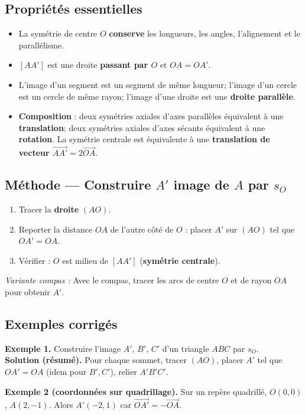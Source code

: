 \subsection*{Propriétés essentielles}
\begin{itemize}
	\item La symétrie de centre $O$ \textbf{conserve} les longueurs, les angles, l’alignement et le parallélisme.
	\item $[AA']$ est une droite \textbf{passant par $O$} et $OA=OA'$.
	\item L’image d’un segment est un segment de même longueur; l’image d’un cercle est un cercle de même rayon; l’image d’une droite est une \textbf{droite parallèle}.
	\item \textbf{Composition} : deux symétries axiales d’axes parallèles équivalent à une \textbf{translation}; deux symétries axiales d’axes sécants équivalent à une \textbf{rotation}. La symétrie centrale est équivalente à une \textbf{translation de vecteur $\overrightarrow{AA'}=2\overrightarrow{OA}$}.
\end{itemize}

\subsection*{Méthode — Construire $A'$ image de $A$ par $s_O$}
\begin{enumerate}
	\item Tracer la \textbf{droite} $(AO)$.
	\item Reporter la distance $OA$ de l’autre côté de $O$ : placer $A'$ sur $(AO)$ tel que $OA'=OA$.
	\item Vérifier : $O$ est milieu de $[AA']$ (\textbf{symétrie centrale}).
\end{enumerate}
\textit{Variante compas :} Avec le compas, tracer les arcs de centre $O$ et de rayon $OA$ pour obtenir $A'$.

\subsection*{Exemples corrigés}
\begin{examplebox}
	\textbf{Exemple 1.} Construire l’image $A'$, $B'$, $C'$ d’un triangle $ABC$ par $s_O$.\\
	\textbf{Solution (résumé).} Pour chaque sommet, tracer $(AO)$, placer $A'$ tel que $OA'=OA$ (idem pour $B',C'$), relier $A'B'C'$.
\end{examplebox}

\begin{examplebox}
	\textbf{Exemple 2 (coordonnées sur quadrillage).} Sur un repère quadrillé, $O(0,0)$, $A(2,{-}1)$. Alors $A'(-2,1)$ car $\overrightarrow{OA'}=-\overrightarrow{OA}$.
\end{examplebox}

